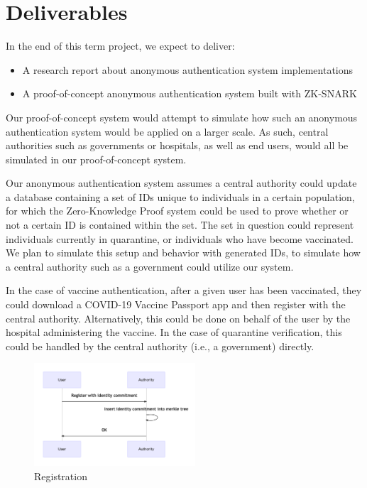 \documentclass[sigconf, nonacm=true]{acmart}
\begin{document}
\section{Deliverables}
In the end of this term project, we expect to deliver:
\begin{itemize}
	\item A research report about anonymous authentication system implementations
	\item A proof-of-concept anonymous authentication system built with ZK-SNARK
\end{itemize}

Our proof-of-concept system would attempt to simulate how such an anonymous authentication system would be applied on a larger scale. As such, central authorities such as governments or hospitals, as well as end users, would all be simulated in our proof-of-concept system.

Our anonymous authentication system assumes a central authority could update a database containing a set of IDs unique to individuals in a certain population, for which the Zero-Knowledge Proof system could be used to prove whether or not a certain ID is contained within the set. The set in question could represent individuals currently in quarantine, or individuals who have become vaccinated. We plan to simulate this setup and behavior with generated IDs, to simulate how a central authority such as a government could utilize our system.

In the case of vaccine authentication, after a given user has been vaccinated, they could download a COVID-19 Vaccine Passport app and then register with the central authority. Alternatively, this could be done on behalf of the user by the hospital administering the vaccine. In the case of quarantine verification, this could be handled by the central authority (i.e., a government) directly.

\begin{figure}[H]
	\centering
	\includegraphics[width=6cm]{image/registration.png}
	\caption{Registration}
	\label{fig:reg}
\end{figure}
\end{document}
